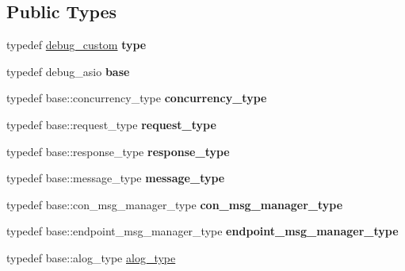 \subsection*{Public Types}
\begin{DoxyCompactItemize}
\item 
typedef \hyperlink{structdebug__custom}{debug\+\_\+custom} {\bfseries type}\hypertarget{structdebug__custom_a0c2f863047e601a152ab98e2f03ff1de}{}\label{structdebug__custom_a0c2f863047e601a152ab98e2f03ff1de}

\item 
typedef debug\+\_\+asio {\bfseries base}\hypertarget{structdebug__custom_ac16a9a8c1bb0eb30b5adb2e9f184fcb3}{}\label{structdebug__custom_ac16a9a8c1bb0eb30b5adb2e9f184fcb3}

\item 
typedef base\+::concurrency\+\_\+type {\bfseries concurrency\+\_\+type}\hypertarget{structdebug__custom_a1ffdef2a98b021355d9ca159b3a608a0}{}\label{structdebug__custom_a1ffdef2a98b021355d9ca159b3a608a0}

\item 
typedef base\+::request\+\_\+type {\bfseries request\+\_\+type}\hypertarget{structdebug__custom_a5226cebb5634477fc5c0bf15e89242ed}{}\label{structdebug__custom_a5226cebb5634477fc5c0bf15e89242ed}

\item 
typedef base\+::response\+\_\+type {\bfseries response\+\_\+type}\hypertarget{structdebug__custom_a2828d399543480214d4a12babb9a3122}{}\label{structdebug__custom_a2828d399543480214d4a12babb9a3122}

\item 
typedef base\+::message\+\_\+type {\bfseries message\+\_\+type}\hypertarget{structdebug__custom_a38a5b4286284cd3bfbb72376ad188513}{}\label{structdebug__custom_a38a5b4286284cd3bfbb72376ad188513}

\item 
typedef base\+::con\+\_\+msg\+\_\+manager\+\_\+type {\bfseries con\+\_\+msg\+\_\+manager\+\_\+type}\hypertarget{structdebug__custom_a4319caaba89b8dfcc38f97500c296b53}{}\label{structdebug__custom_a4319caaba89b8dfcc38f97500c296b53}

\item 
typedef base\+::endpoint\+\_\+msg\+\_\+manager\+\_\+type {\bfseries endpoint\+\_\+msg\+\_\+manager\+\_\+type}\hypertarget{structdebug__custom_a80e300fc1e5108ff0fed4b323ff6cf2f}{}\label{structdebug__custom_a80e300fc1e5108ff0fed4b323ff6cf2f}

\item 
typedef base\+::alog\+\_\+type \hyperlink{structdebug__custom_a30b665e32e61e9ded636e08b937786c3}{alog\+\_\+type}\hypertarget{structdebug__custom_a30b665e32e61e9ded636e08b937786c3}{}\label{structdebug__custom_a30b665e32e61e9ded636e08b937786c3}


\end{DoxyCompactItemize}
